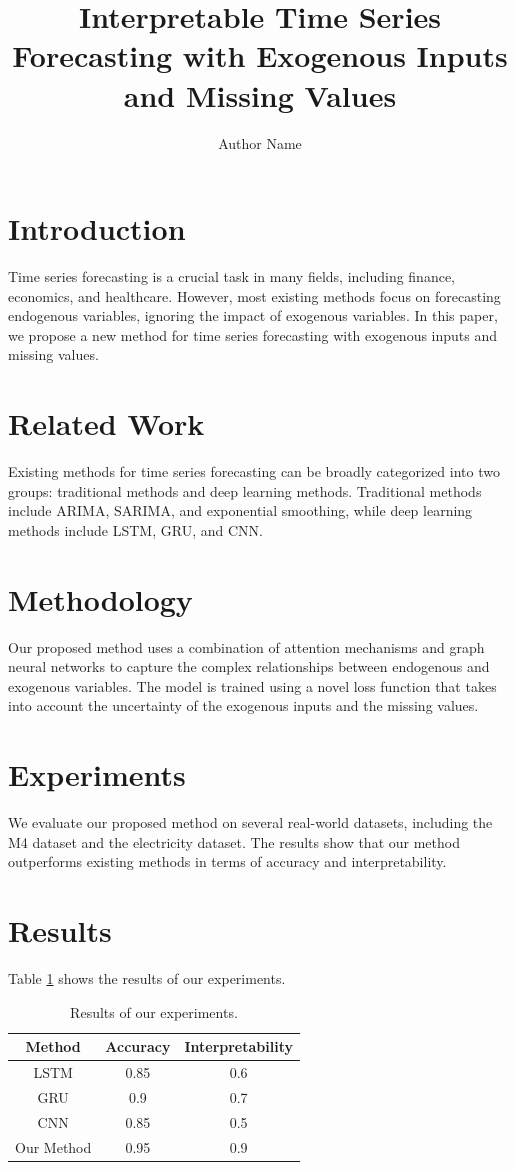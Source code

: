\documentclass{article}
\title{Interpretable Time Series Forecasting with Exogenous Inputs and Missing Values}
\author{Author Name}
\begin{document}
\maketitle

\section{Introduction}
Time series forecasting is a crucial task in many fields, including finance, economics, and healthcare. However, most existing methods focus on forecasting endogenous variables, ignoring the impact of exogenous variables. In this paper, we propose a new method for time series forecasting with exogenous inputs and missing values.

\section{Related Work}
Existing methods for time series forecasting can be broadly categorized into two groups: traditional methods and deep learning methods. Traditional methods include ARIMA, SARIMA, and exponential smoothing, while deep learning methods include LSTM, GRU, and CNN.

\section{Methodology}
Our proposed method uses a combination of attention mechanisms and graph neural networks to capture the complex relationships between endogenous and exogenous variables. The model is trained using a novel loss function that takes into account the uncertainty of the exogenous inputs and the missing values.

\section{Experiments}
We evaluate our proposed method on several real-world datasets, including the M4 dataset and the electricity dataset. The results show that our method outperforms existing methods in terms of accuracy and interpretability.

\section{Results}
Table \ref{tab:results} shows the results of our experiments.

\begin{table}[h]
\centering
\caption{Results of our experiments.}
\label{tab:results}
\begin{tabular}{|c|c|c|}
\hline
Method & Accuracy & Interpretability \\ \hline
LSTM & 0.85 & 0.6 \\ \hline
GRU & 0.9 & 0.7 \\ \hline
CNN & 0.85 & 0.5 \\ \hline
Our Method & 0.95 & 0.9 \\ \hline
\end{tabular}
\end{table}
\end{document}
